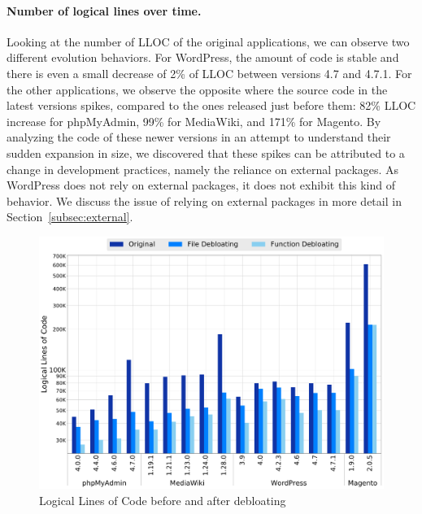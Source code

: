 \paragraph{Number of logical lines over time.}
Looking at the number of LLOC of the original applications, we can observe two different evolution behaviors.
For WordPress, the amount of code is stable and there is even a small decrease of 2\% of LLOC between versions 4.7 and 4.7.1.
For the other applications, we observe the opposite where the source code in the latest versions spikes, compared to the ones released just before them: 82\% LLOC increase for phpMyAdmin, 99\% for MediaWiki, and 171\% for Magento. By
analyzing the code of these newer versions in an attempt to understand their
sudden expansion in size, we discovered that these spikes can be attributed to
a change in development practices, namely the reliance on external packages.
As WordPress does not rely on external packages, it does not exhibit this kind of behavior. We
discuss the issue of relying on external packages in more detail in Section~\ref{subsec:external}.


\begin{figure}[t]
  \includegraphics[width=\linewidth]{figures/lim/lloc.pdf}
  \caption{Logical Lines of Code before and after debloating}
  \label{fig:lloc}
\end{figure}


